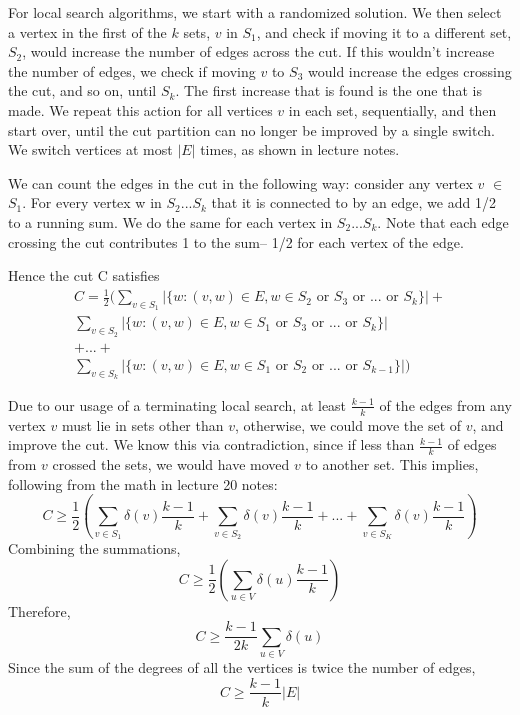 \documentclass[11pt]{article}
\begin{document}
For local search algorithms, we start with a randomized solution. We then select a vertex in the first of the $k$ sets, $v$ in $S_1$, and check if moving it to a different set, $S_2$, would increase the number of edges across the cut. If this wouldn't increase the number of edges, we check if moving $v$ to $S_3$ would increase the edges crossing the cut, and so on, until $S_k$. The first increase that is found is the one that is made. We repeat this action for all vertices $v$ in each set, sequentially, and then start over, until the cut partition can no longer be improved by a single switch. We switch vertices at most $|E|$ times, as shown in lecture notes. 

We can count the edges in the cut in the following way: consider any vertex $v$ $\in$ $S_1$. For every vertex w in $S_2...S_k$ that it is connected to by an edge, we add 1/2 to a running sum. We do the same for each vertex in $S_2...S_k$. Note that each edge crossing the cut contributes 1 to the sum– 1/2 for each vertex of the edge.

Hence the cut C satisfies
\begin{multline*}
	C= \frac{1}{2} (\sum_{v\in S_1}|\{w:(v,w)\in E, w \in S_2 \text{ or } S_3 \text{ or } ... \text{ or } S_k\}|+ \\
	\sum_{v\in S_2}|\{w:(v,w) \in E, w \in S_1\text{ or } S_3 \text{ or } ... \text{ or } S_k\}| \\
	+ ... + \\ 
	\sum_{v\in S_k}|\{w:(v,w) \in E, w \in S_1\text{ or } S_2 \text{ or } ... \text{ or } S_{k-1}\}|)
\end{multline*}

Due to our usage of a terminating local search, at least $\frac{k-1}{k}$ of the edges from any vertex $v$ must lie in sets other than $v$, otherwise, we could move the set of $v$, and improve the cut. We know this via contradiction, since if less than $\frac{k-1}{k}$ of edges from $v$ crossed the sets, we would have  moved $v$ to another set. This implies, following from the math in lecture 20 notes:
\begin{equation*}
	C \geq \frac{1}{2}(\sum_{v \in S_1} \delta(v)\frac{k-1}{k} + \sum_{v \in S_2} \delta(v)\frac{k-1}{k} + ... + \sum_{v \in S_K} \delta(v)\frac{k-1}{k})	
\end{equation*}
Combining the summations,
\begin{equation*}
	C \geq \frac{1}{2}(\sum_{u \in V} \delta(u)\frac{k-1}{k})	
\end{equation*}
Therefore,
\begin{equation*}
	C \geq \frac{k-1}{2k}\sum_{u \in V} \delta(u)
\end{equation*}
Since the sum of the degrees of all the vertices is twice the number of edges,
\begin{equation*}
	C \geq \frac{k-1}{k}|E|
\end{equation*}
\end{document}
